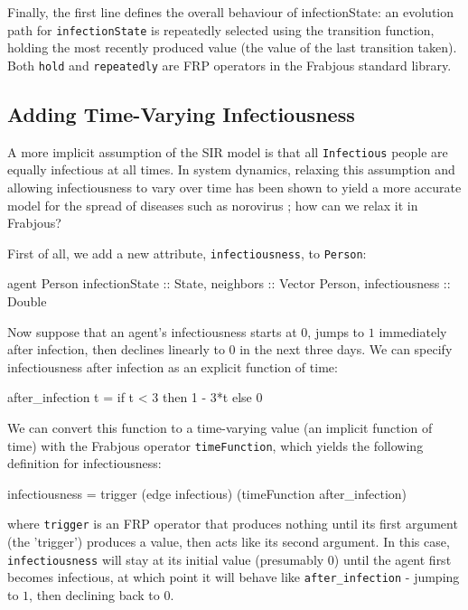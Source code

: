 \documentclass{llncs}
\begin{document}
   Finally, the first line defines the overall behaviour of infectionState: an evolution path for \lstinline{infectionState} is repeatedly selected using the transition function, holding the most recently produced value (the value of the last transition taken). Both \lstinline{hold} and \lstinline{repeatedly} are FRP operators in the Frabjous standard library. 
   
\subsection{Adding Time-Varying Infectiousness}

  A more implicit assumption of the SIR model is that all \lstinline{Infectious} people are equally infectious at all times. In system dynamics, relaxing this assumption and allowing infectiousness to vary over time has been shown to yield a more accurate model for the spread of diseases such as norovirus \cite{time_varying_infectiousness}; how can we relax it in Frabjous? 

 First of all, we add a new attribute, \lstinline{infectiousness}, to \lstinline{Person}: 
\begin{code}
agent Person { infectionState :: State, 
		neighbors :: Vector Person, 
		infectiousness :: Double} 
\end{code}

Now suppose that an agent's infectiousness starts at $0$, jumps to $1$ immediately after infection, then declines linearly to $0$ in the next three days. We can specify infectiousness after infection as an explicit function of time: 
\begin{code}
after_infection t =  if t < 3 then 1 - 3*t
                                             else 0 
\end{code}

We can convert this function to a time-varying value (an implicit function of time) with the Frabjous operator \lstinline{timeFunction}, which yields the following definition for infectiousness:
\begin{code}
infectiousness = trigger (edge infectious) 
			 (timeFunction after_infection)
\end{code}
where \lstinline{trigger} is an FRP operator that produces nothing until its first argument (the 'trigger') produces a value, then acts like its second argument. In this case, \lstinline{infectiousness} will stay at its initial value (presumably $0$) until the agent first becomes infectious, at which point it will behave like \lstinline{after_infection} - jumping to $1$, then declining back to $0$. 
\end{document}
